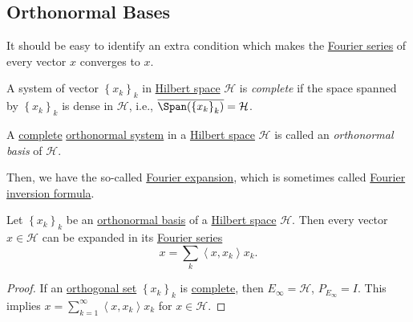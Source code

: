 \subsection{Orthonormal Bases}
It should be easy to identify an extra condition which makes the \hyperref[def:Fourier-series]{Fourier series} of every vector \(x\) converges to \(x\).

\begin{definition}\label{def:complete-system}
	A system of vector \(\left\{ x_k\right\}_k\) in \hyperref[def:Hilbert-space]{Hilbert space} \(\mathcal{H} \) is \emph{complete} if the space spanned by \(\left\{ x_k\right\}_k\) is dense in \(\mathcal{H} \), i.e., \(\overline{\Span(\left\{ x_k \right\} _k)} = \mathcal{H} \).
\end{definition}

\begin{definition}\label{def:orthonormal-basis}
	A \hyperref[def:complete-system]{complete} \hyperref[def:orthonormal-system]{orthonormal system} in a \hyperref[def:Hilbert-space]{Hilbert space} \(\mathcal{H} \) is called an \emph{orthonormal basis} of \(\mathcal{H} \).
\end{definition}

Then, we have the so-called \hyperref[thm:Fourier-expansion]{Fourier expansion}, which is sometimes called \href{https://en.wikipedia.org/wiki/Fourier_inversion_theorem}{Fourier inversion formula}.

\begin{theorem}\label{thm:Fourier-expansion}
	Let \(\left\{ x_k \right\} _k\) be an \hyperref[def:orthonormal-basis]{orthonormal basis} of a \hyperref[def:Hilbert-space]{Hilbert space} \(\mathcal{H} \). Then every vector \(x\in \mathcal{H} \) can be expanded in its \hyperref[def:Fourier-series]{Fourier series}
	\[
		x = \sum_{k} \left\langle x, x_k \right\rangle x_k.
	\]
\end{theorem}
\begin{proof}
	If an \hyperref[def:orthogonal-system]{orthogonal set} \(\left\{ x_{k} \right\}_k \) is \hyperref[def:complete-system]{complete}, then \(E_\infty = \mathcal{H} \), \(P_{E_\infty } = I\). This implies \(x = \sum_{k=1}^{\infty} \left\langle x, x_{k}  \right\rangle x_{k}\) for \(x\in \mathcal{H} \).
\end{proof}

